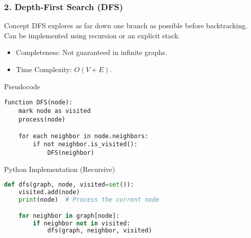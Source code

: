 \documentclass[aspectratio=169]{beamer}
\begin{document}
\begin{frame}[fragile]
    \frametitle{2. Depth-First Search (DFS)}
    \begin{block}{Concept}
        DFS explores as far down one branch as possible before backtracking. Can be implemented using recursion or an explicit stack.
    \end{block}
    \begin{itemize}
        \item Completeness: Not guaranteed in infinite graphs.
        \item Time Complexity: $O(V + E)$.
    \end{itemize}
    \begin{block}{Pseudocode}
    \begin{lstlisting}
function DFS(node):
    mark node as visited
    process(node)
    
    for each neighbor in node.neighbors:
        if not neighbor.is_visited():
            DFS(neighbor)
    \end{lstlisting}
    \end{block}
    \begin{block}{Python Implementation (Recursive)}
    \begin{lstlisting}[language=Python]
def dfs(graph, node, visited=set()):
    visited.add(node)
    print(node)  # Process the current node

    for neighbor in graph[node]:
        if neighbor not in visited:
            dfs(graph, neighbor, visited)
    \end{lstlisting}
    \end{block}
\end{frame}
\end{document}

